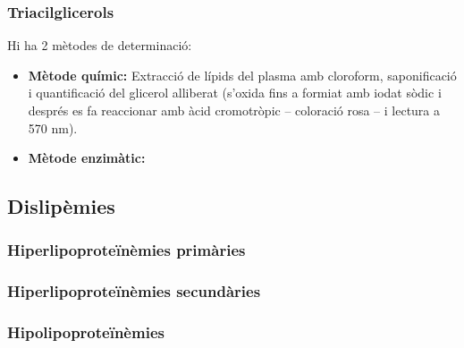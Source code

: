 \subsubsection{Triacilglicerols}
\label{sec:triacilglicerols}
Hi ha 2 mètodes de determinació:
\begin{itemize}
\item \textbf{Mètode químic:} Extracció de lípids del plasma amb cloroform,
  saponificació i quantificació del glicerol alliberat (s'oxida fins a
  formiat amb iodat sòdic i després es fa reaccionar amb àcid
  cromotròpic – coloració rosa – i lectura a 570 nm).

\item \textbf{Mètode enzimàtic:}
\end{itemize}


\subsection{Dislipèmies}
\label{sec:dislipemies}

\subsubsection{Hiperlipoproteïnèmies primàries}
\label{sec:hiperl-prim}


\subsubsection{Hiperlipoproteïnèmies secundàries}
\label{sec:hiperl-secund}


\subsubsection{Hipolipoproteïnèmies}
\label{sec:hipolipoproteinemies}

